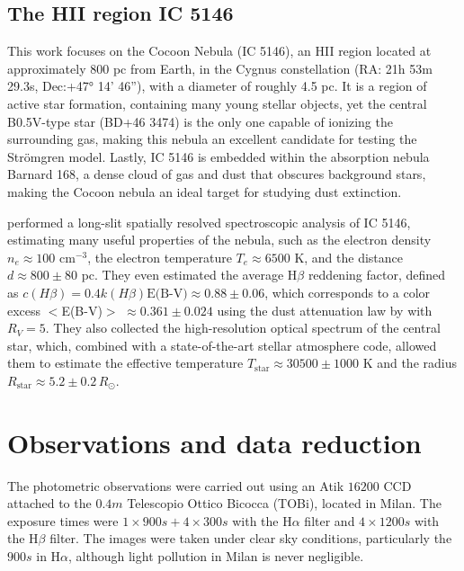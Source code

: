 \documentclass[fleqn,usenatbib]{mnras}
\begin{document}
\subsection{The HII region IC 5146}\label{sec:ic5146_introduction}
This work focuses on the Cocoon Nebula (IC 5146), an HII region located at approximately $800$ pc from Earth, in the Cygnus constellation (RA: 21h 53m 29.3s, Dec:+47° 14’ 46”), with a diameter of roughly 4.5 pc. 
It is a region of active star formation, containing many young stellar objects, yet the central B0.5V-type star (BD+46 3474) is the only one capable of ionizing the surrounding gas, making this nebula an excellent candidate for testing the Strömgren model.
Lastly, IC 5146 is embedded within the absorption nebula Barnard 168, a dense cloud of gas and dust that obscures background stars, making the Cocoon nebula an ideal target for studying dust extinction.

\citet{Garcia-Rojas_2014} performed a long-slit spatially resolved spectroscopic analysis of IC 5146, estimating many useful properties of the nebula, such as the electron density $n_e \approx 100$ cm$^{-3}$, the electron temperature $T_e \approx 6500$ K, and the distance $d \approx 800 \pm 80$ pc.
They even estimated the average H$\beta$ reddening factor, defined as $c(H\beta) = 0.4 k(H\beta) \text{E(B-V)} \approx 0.88 \pm 0.06$, which corresponds to a color excess $<$E(B-V)$>$ $\approx 0.361 \pm 0.024$ using the dust attenuation law by \cite{Cardelli_1989} with $R_V = 5$.
They also collected the high-resolution optical spectrum of the central star, which, combined with a state-of-the-art stellar atmosphere code, allowed them to estimate the effective temperature $T_\text{star} \approx 30500 \pm 1000$ K and the radius $R_\text{star} \approx 5.2 \pm 0.2 \, R_\odot$.



\section{Observations and data reduction}\label{sec:observation}
The photometric observations were carried out using an Atik $16200$ CCD attached to the $0.4m$ Telescopio Ottico Bicocca (TOBi), located in Milan. 
The exposure times were $1 \times 900s + 4 \times 300s$ with the H$\alpha$ filter and $4 \times 1200s$ with the H$\beta$ filter. The images were taken under clear sky conditions, particularly the $900s$ in H$\alpha$, although light pollution in Milan is never negligible.
\smallskip
\end{document}
